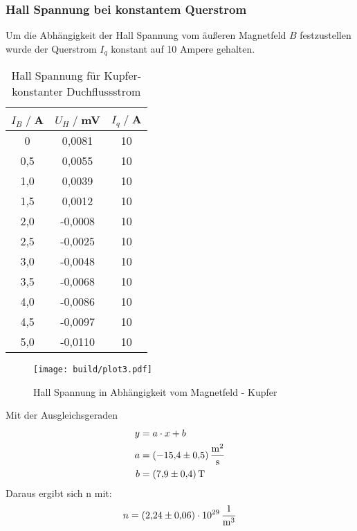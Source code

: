 \subsubsection{Hall Spannung bei konstantem Querstrom}
Um die Abhängigkeit der Hall Spannung vom äußeren Magnetfeld $B$ festzustellen wurde der Querstrom $I_q$ konstant auf 10 Ampere gehalten.
\begin{table}
    \centering
    \begin{tabular}{c c c}
        \toprule
        $I_{B} \;/\;$A & $U_H\;/\;$mV & $I_{q} \;/\;$A\\
        \midrule
        0                   &0,0081              &10\\
        0,5                 &0,0055              &10\\
        1,0                 &0,0039              &10\\
        1,5                 &0,0012              &10\\
        2,0                 &-0,0008             &10\\
        2,5                 &-0,0025             &10\\
        3,0                 &-0,0048             &10\\
        3,5                 &-0,0068             &10\\
        4,0                 &-0,0086             &10\\
        4,5                 &-0,0097             &10\\
        5,0                 &-0,0110             &10\\
        \bottomrule
    \end{tabular}
    \caption{Hall Spannung für Kupfer- konstanter Duchflussstrom}
    \label{tab:Cu_B}
\end{table}
\begin{figure}[H]
    \centering
    \texttt{[image: build/plot3.pdf]}
    \caption{Hall Spannung in Abhängigkeit vom Magnetfeld - Kupfer}
    \label{fig:Cu_B}
\end{figure}
Mit der Ausgleichsgeraden
\begin{align*}
    y &= a \cdot x + b\\
    a &=  \SI{-15,4 \pm 0,5 }{\square \meter \per \second}\\
    b &=  \SI{7,9\pm0,4}{\tesla}\\
\end{align*}
Daraus ergibt sich n mit:
\begin{align}
    n = \SI{2,24\pm0,06 e29}{\per \cubic \metre}
\end{align}


